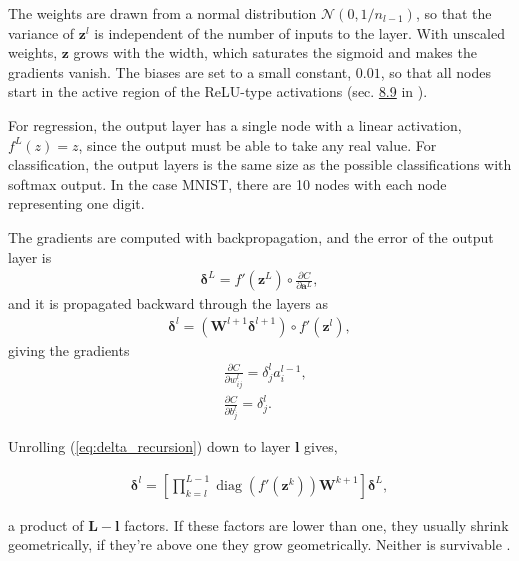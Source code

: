 \documentclass[reprint,english,notitlepage, floatfix]{revtex4-2}  %
\begin{document}
The weights are drawn from a normal distribution $\mathcal{N}(0, 1 / n_{l-1})$, so that the variance of $\boldsymbol{z}^l$ is independent of the number of inputs to the layer. With unscaled weights, $\boldsymbol{z}$ grows with the width, which saturates the sigmoid and makes the gradients vanish. The biases are set to a small constant, $0.01$, so that all nodes start in the active region of the ReLU-type activations (sec. \href{https://educationalmaterialuio.github.io/MachineLearningUiO/doc/LectureNotes/_build/html/chapter8.html#vanishing-and-exploding-gradients}{8.9} in \cite{lecture_book}).

For regression, the output layer has a single node with a linear activation, $f^L(z) = z$, since the output must be able to take any real value. For classification, the output layers is the same size as the possible classifications with softmax output. In the case MNIST, there are 10 nodes with each node representing one digit.

The gradients are computed with backpropagation, and the error of the output layer is 
\begin{align*}
    \boldsymbol{\delta}^L = f'(\boldsymbol{z}^L) \circ \frac{\partial C}{\partial \boldsymbol{a}^L} ,
\end{align*}
and it is propagated backward through the layers as 
\begin{align}\label{eq:delta_recursion}
    \boldsymbol{\delta}^l = \left(\boldsymbol{W}^{l + 1} \boldsymbol{\delta}^{l + 1} \right) \circ f'(\boldsymbol{z}^l),
\end{align}
giving the gradients
\begin{align*}
    &\frac{\partial C}{\partial w_{ij}^l}  = \delta _j^l a_i^{l-1},\\
    & \frac{\partial C}{\partial b_{j}^l}  =  \delta^l_j.
\end{align*}

Unrolling (\autoref{eq:delta_recursion}) down to layer $\bm{l}$ gives,

\begin{align}\label{eq:delta_unrolled}
    \boldsymbol{\delta}^l = \left[ \prod_{k=l}^{L-1} \operatorname{diag}\left(f'(\boldsymbol{z}^k)\right) \boldsymbol{W}^{k+1} \right] \boldsymbol{\delta}^L,
\end{align}

a product of $\bm{L} - \bm{l}$ factors. If these factors are lower than one, they usually shrink geometrically, if they're above one they grow geometrically. Neither is survivable \cite{chapter8}. 
\end{document}
